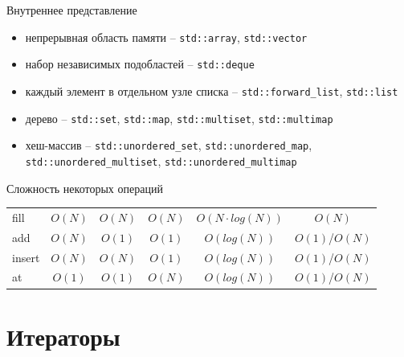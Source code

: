 \documentclass[unknownkeysallowed,xcolor=table]{beamer}
\newcommand{\rot}[1]{\makebox[1em][l]{\rotatebox{45}{#1}}}
\begin{document}
\begin{frame}{Внутреннее представление}

\begin{itemize}
  \item непрерывная область памяти -- \lstinline{std::array}, \lstinline{std::vector} \vspace{1em}
  \item набор независимых подобластей -- \lstinline{std::deque} \vspace{1em}
  \item каждый элемент в отдельном узле списка -- \lstinline{std::forward_list}, \lstinline{std::list} \vspace{1em}
  \item дерево -- \lstinline{std::set}, \lstinline{std::map}, \lstinline{std::multiset}, \lstinline{std::multimap} \vspace{1em}
  \item хеш-массив -- \lstinline{std::unordered_set}, \lstinline{std::unordered_map}, \lstinline{std::unordered_multiset}, \lstinline{std::unordered_multimap}
\end{itemize}

\end{frame}

\begin{frame}[fragile]{Сложность некоторых операций}

\begin{center}
\begin{tabular}{ l | c c c c c }
  \hline
    & \rot{vector} & \rot{deque} & \rot{list} & \rot{map} & \rot{unordered\_map} \\
  \hline
    fill & $O(N)$ & $O(N)$ & $O(N)$ & $O(N \cdot log(N))$ & $O(N)$ \\
    add & $O(N)$ & $O(1)$ & $O(1)$ & $O(log(N))$ & $O(1)$/$O(N)$ \\
    insert & $O(N)$ & $O(N)$ & $O(1)$ & $O(log(N))$ & $O(1)$/$O(N)$ \\
    at & $O(1)$ & $O(1)$ & $O(N)$ & $O(log(N))$ & $O(1)$/$O(N)$ \\
\end{tabular}
\end{center}

\end{frame}


\section{Итераторы}
\end{document}
